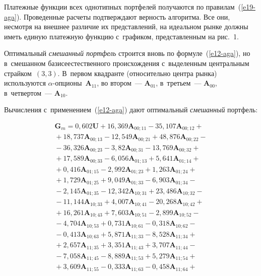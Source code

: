 \begin{multicols}{2}
\vspace*{-2pt}


  
  Платежные функции всех однотипных портфелей получаются по 
правилам~(\ref{e19-aga}). Проведенные расчеты под\-тверж\-да\-ют вер\-ность 
алгоритма. Все они, несмотря на внешнее различие их пред\-став\-ле\-ний, на 
идеальном рынке должны иметь единую платежную функцию с~графиком, 
пред\-став\-лен\-ным на рис.~1. 
  
  Оптимальный \textit{смешанный портфель} строится вновь по 
формуле~(\ref{e12-aga}), но в~смешанном базисе\linebreak естественного происхождения с~выделенным 
цент\-раль\-ным страйком~$(3, 3)$. В~первом квад\-ран\-те\linebreak 
(относительно цент\-ра рынка) используются $\alpha$-оп\-ци\-оны~$\bm{A}_{11}$, во 
втором~--- $\bm{A}_{01}$, в~треть\-ем~--- $\bm{A}_{00}$, в~\mbox{чет\-вер\-том}~--- 
$\bm{A}_{10}$. 
  
  Вычисления с~применением~(\ref{e12-aga}) дают оптимальный 
\textit{смешанный} портфель:

\vspace*{-2pt}
 

\noindent
\begin{multline*}
  \bm{G}_m=0{,}602\bm{U} + 16{,}369\bm{A}_{00;11} - 35{,}107\bm{A}_{00;12} + {}\\
  {}+
18{,}737\bm{A}_{00;13} - 12{,}549\bm{A}_{00;21} + 48{,}876\bm{A}_{00;22} - {}\\
{}-
36{,}326\bm{A}_{00;23} - 3{,}82\bm{A}_{00;31} - 13{,}769\bm{A}_{00;32} +{}\\
{}+ 17{,}589\bm{A}_{00;33} - 
6{,}056\bm{A}_{01;13} + 5{,}641\bm{A}_{01;14} +{}\\
{}+ 0{,}416\bm{A}_{01;15} - 2{,}992\bm{A}_{01;23} + 
1{,}263\bm{A}_{01;24} + {}\\
{}+1{,}729\bm{A}_{01;25} + 9{,}049\bm{A}_{01;33} - 6{,}903\bm{A}_{01;34} - {}\\
{}-2{,}145\bm{A}_{01;35} - 12{,}342\bm{A}_{10;31} + 23{,}486\bm{A}_{10;32} - {}\\
{}-11{,}144\bm{A}_{10;33} + 4{,}007\bm{A}_{10;41} - 20{,}268\bm{A}_{10;42} + {}\\
{}+16{,}261\bm{A}_{10;43} + 7{,}603\bm{A}_{10;51} - 2{,}899\bm{A}_{10;52} -{}\\
{}-4{,}704\bm{A}_{10;53} +  0{,}731\bm{A}_{10;61} - 0{,}318\bm{A}_{10;62} - {}\\
{}-0{,}413\bm{A}_{10;63} + 5{,}871\bm{A}_{11;33} - 8{,}528\bm{A}_{11;34} +{}\\
{}+ 2{,}657\bm{A}_{11;35} + 3{,}351\bm{A}_{11;43} + 3{,}707\bm{A}_{11;44} - {}\\
{}-7{,}058\bm{A}_{11;45} - 8{,}889\bm{A}_{11;53} + 5{,}279\bm{A}_{11;54} +{}\\
{}+ 3{,}609\bm{A}_{11;55} - 0{,}333\bm{A}_{11;63} - 0{,}458\bm{A}_{11;64} +{}
\end{multline*}


\end{multicols}
